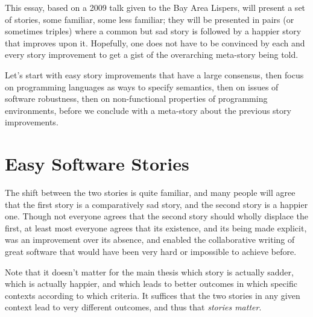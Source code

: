 \documentclass[a4paper,UKenglish]{lipics}
\begin{document}
This essay, based on a 2009 talk given to the Bay Area Lispers,
will present a set of stories, some familiar, some less familiar;
they will be presented in pairs (or sometimes triples)
where a common but sad story is followed
by a happier story that improves upon it.
Hopefully, one does not have to be convinced by each and every story improvement
to get a gist of the overarching meta-story being told.

Let's start with easy story improvements that have a large consensus,
then focus on programming languages as ways to specify semantics,
then on issues of software robustness,
then on non-functional properties of programming environments,
before we conclude with a meta-story about the previous story improvements.

\section{Easy Software Stories}

The shift between the two stories is quite familiar, and many people will agree that
the first story is a comparatively sad story, and the second story is a happier one.
Though not everyone agrees that the second story should wholly displace the first,
at least most everyone agrees that its existence, and its being made explicit,
was an improvement over its absence, and enabled the collaborative writing of great software
that would have been very hard or impossible to achieve before.

Note that it doesn't matter for the main thesis which story is actually sadder,
which is actually happier, and which leads to better outcomes
in which specific contexts according to which criteria.
It suffices that the two stories in any given context
lead to very different outcomes, and thus that \emph{stories matter}.
\end{document}
